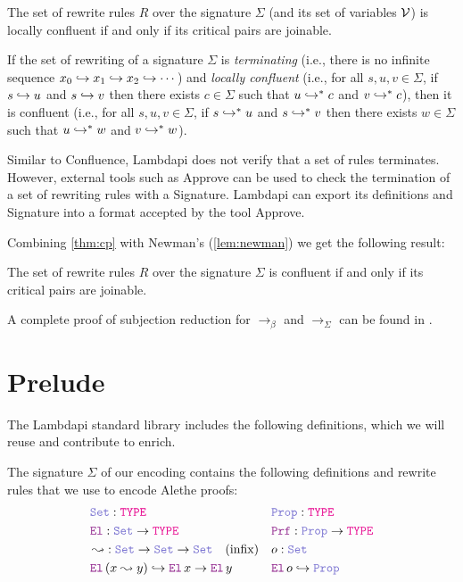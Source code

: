 \begin{theorem}\label{thm:cp}
The set of rewrite rules $R$ over the signature $\Sigma$ (and its set of variables $\cal{V}$) is locally confluent if and only if its critical pairs are joinable.
\end{theorem}


\begin{lemma}\label{lem:newman}
If the set of rewriting of a signature $\Sigma$ is \emph{terminating} (i.e., there is no infinite sequence
$x_0 \re x_1 \re x_2 \re \cdots$) and \emph{locally confluent} (i.e., for all $s,u,v \in \Sigma$, if $s \re u$ and $s \re v$ then there exists
$c \in \Sigma$ such that $u \re^{*} c$ and $v \re^{*} c$), then it is confluent (i.e., for all $s,u,v \in \Sigma$, if $s \re^{*} u$ and
$s \re^{*} v$ then there exists $w \in \Sigma$ such that $u \re^{*} w$ and $v \re^{*} w$).
\end{lemma}

\begin{remark}
Similar to Confluence, Lambdapi does not verify that a set of rules terminates.
However, external tools such as Approve \cite{aprove} can be used to check the termination of a set of rewriting rules with a Signature.
Lambdapi can export its definitions and Signature into a format accepted by the tool Approve.
\end{remark}

Combining \cref{thm:cp} with Newman's (\cref{lem:newman}) we get the following result:

\begin{corollary}
The set of rewrite rules $R$ over the signature $\Sigma$ is confluent if and only if its critical pairs are joinable.
\end{corollary}

A complete proof of subjection reduction for $\longrightarrow_\beta$ and $\longrightarrow_\Sigma$ can be found in \cite[\S 2.6.4]{Dedukti-ref2}.

\section{Prelude}
\label{sec:prelude-lp}

The Lambdapi standard library includes the following definitions, which we will reuse and contribute to enrich.

\begin{definition}
\label{def:defuniv}
The signature $\Sigma$ of our encoding contains the following definitions and rewrite rules that we use to encode Alethe proofs:
\begin{align*}
&\set\index{\set}: \type & &\prop\index{\prop}: \type \\
&\index{\el{}} \el{}: \set \rightarrow \type  & &\index{\prf}\prf{} : \prop \rightarrow \type \\
&\mathop{\leadsto}\index{$\leadsto$}: \set \rightarrow \set \rightarrow \set \quad \text{(infix)} & &o: \set \\
&\el\,(x \leadsto y) \hookrightarrow \el\,x \rightarrow \el\,y & &\el\,o\index{o}  \hookrightarrow \prop
\end{align*}
\end{definition}

